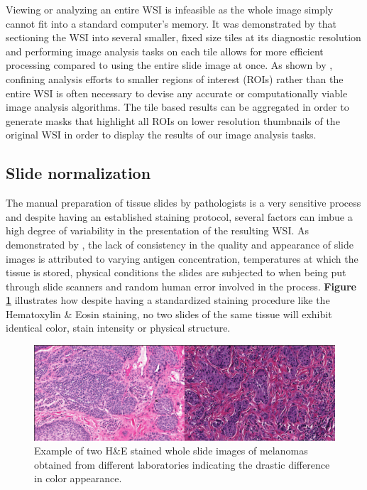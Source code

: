 \documentclass{l4proj}
\begin{document}
Viewing or analyzing an entire WSI is infeasible as the whole image simply cannot fit into a standard computer's memory. It was demonstrated by \cite{wang2012managing} that sectioning the WSI into several smaller, fixed size tiles at its diagnostic resolution and performing image analysis tasks on each tile allows for more efficient processing compared to using the entire slide image at once. As shown by \cite{aeffner2019introduction}, confining analysis efforts to smaller regions of interest (ROIs) rather than the entire WSI is often necessary to devise any accurate or computationally viable image analysis algorithms. The tile based results can be aggregated in order to generate masks that highlight all ROIs on lower resolution thumbnails of the original WSI in order to display the results of our image analysis tasks. 

\subsection{Slide normalization}
The manual preparation of tissue slides by pathologists is a very sensitive process and despite having an established staining protocol, several factors can imbue a high degree of variability in the presentation of the resulting WSI. As demonstrated by \cite{anghel2019high}, the lack of consistency in the quality and appearance of slide images is attributed to varying antigen concentration, temperatures at which the tissue is stored, physical conditions the slides are subjected to when being put through slide scanners and random human error involved in the process. \textbf{Figure \ref{fig:he-stain-difference}} illustrates how despite having a standardized staining procedure like the Hematoxylin \& Eosin staining, no two slides of the same tissue will exhibit identical color, stain intensity or physical structure.   

\begin{figure}[h]
\centering
\includegraphics[scale=0.7]{images/stain-difference-slide.png}
\caption{Example of two H\&E stained whole slide images of melanomas obtained from different laboratories indicating the drastic difference in color appearance.}
\label{fig:he-stain-difference}
\end{figure}
\end{document}
